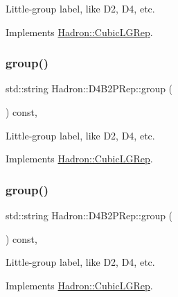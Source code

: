 Little-\/group label, like D2, D4, etc. 

Implements \mbox{\hyperlink{structHadron_1_1CubicLGRep_a9bdb14b519a611d21379ed96a3a9eb41}{Hadron\+::\+Cubic\+L\+G\+Rep}}.

\mbox{\label{structHadron_1_1D4B2PRep_aa71574997466ab08fe9b29f7f35ff7f3}} 
\subsubsection{\texorpdfstring{group()}{group()}\hspace{0.1cm}{\footnotesize\ttfamily [2/3]}}
{\footnotesize\ttfamily std\+::string Hadron\+::\+D4\+B2\+P\+Rep\+::group (\begin{DoxyParamCaption}{ }\end{DoxyParamCaption}) const\hspace{0.3cm}{\ttfamily [inline]}, {\ttfamily [virtual]}}

Little-\/group label, like D2, D4, etc. 

Implements \mbox{\hyperlink{structHadron_1_1CubicLGRep_a9bdb14b519a611d21379ed96a3a9eb41}{Hadron\+::\+Cubic\+L\+G\+Rep}}.

\mbox{\label{structHadron_1_1D4B2PRep_aa71574997466ab08fe9b29f7f35ff7f3}} 
\subsubsection{\texorpdfstring{group()}{group()}\hspace{0.1cm}{\footnotesize\ttfamily [3/3]}}
{\footnotesize\ttfamily std\+::string Hadron\+::\+D4\+B2\+P\+Rep\+::group (\begin{DoxyParamCaption}{ }\end{DoxyParamCaption}) const\hspace{0.3cm}{\ttfamily [inline]}, {\ttfamily [virtual]}}

Little-\/group label, like D2, D4, etc. 

Implements \mbox{\hyperlink{structHadron_1_1CubicLGRep_a9bdb14b519a611d21379ed96a3a9eb41}{Hadron\+::\+Cubic\+L\+G\+Rep}}.

\mbox{\label{structHadron_1_1D4B2PRep_abe22fc63677217f78086bf135b443912}} 
